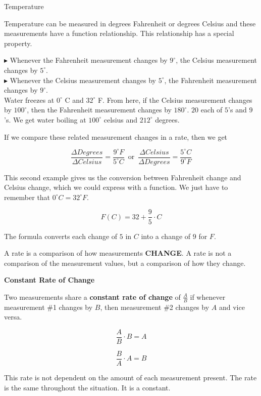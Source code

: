 \documentclass{ximera}
\begin{document}
\begin{example} Temperature


Temperature can be measured in degrees Fahrenheit or degrees Celsius and these measurements have a function relationship. This relationship has a special property.


$\blacktriangleright$ Whenever the Fahrenheit measurement changes by $9^{\circ}$, the Celsius measurement changes by $5^{\circ}$. \\
$\blacktriangleright$ Whenever the Celsius measurement changes by $5^{\circ}$, the Fahrenheit measurement changes by $9^{\circ}$. \\



Water freezes at $0^{\circ}$ C and $32^{\circ}$ F.  From here, if the Celsius measurement changes by $100^{\circ}$, then the Fahrenheit measurement changes by $180^{\circ}$.  $20$ each of $5$'s and $9$'s. We get water boiling at $100^{\circ}$ celsius and $212^{\circ}$ degrees.


If we compare these related measurement changes in a rate, then we get

\[
\frac{\Delta Degrees}{\Delta Celsius} = \frac{9^{\circ}F}{5^{\circ}C} \, \text{ or } \, \frac{\Delta Celsius}{\Delta Degrees} = \frac{5^{\circ}C}{9^{\circ}F}
\]


\end{example} 


This second example gives us the conversion between Fahrenheit change and Celsius change, which we could express with a function.  We just have to remember that $0^{\circ}C = 32^{\circ}F$.

\[
F(C) = 32 + \frac{9}{5} \cdot C
\]


The formula converts each change of $5$ in $C$ into a change of $9$ for $F$.



A rate is a comparison of how measurements \textbf{\textcolor{purple!85!blue}{CHANGE}}. A rate is not a comparison of the measurement values, but a comparison of how they change. 



\begin{definition} \textbf{\textcolor{green!50!black}{Constant Rate of Change}} 


Two measurements share a \textbf{constant rate of change} of $\tfrac{A}{B}$ if whenever measurement \#1 changes by $B$, then measurement \#2 changes by $A$ and vice versa.

\[  \frac{A}{B} \cdot B = A \] 

\[  \frac{B}{A} \cdot A = B \] 


This rate is not dependent on the amount of each measurement present.  The rate is the same throughout the situation.  It is a constant.




\end{definition}
\end{document}
